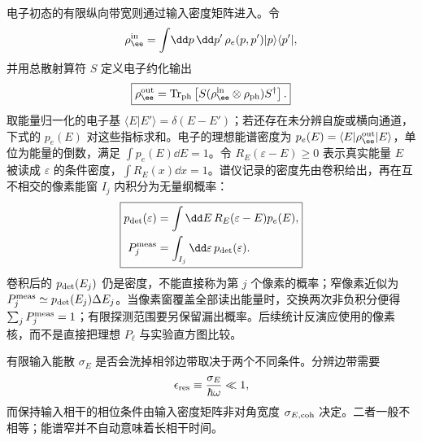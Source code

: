 电子初态的有限纵向带宽则通过输入密度矩阵进入。令
\begin{equation*}
 \rho_\ee^{\rm in}
 =\int\!\dd p\,\dd p'\,
 \rho_e(p,p')|p\rangle\langle p'|,
\end{equation*}
并用总散射算符 $S$ 定义电子约化输出
\begin{equation}
\boxed{
 \rho_\ee^{\rm out}
 =\operatorname{Tr}_{\rm ph}
 \left[S(\rho_\ee^{\rm in}\otimes\rho_{\rm ph})S^\dagger\right].}
\label{eq:finite_envelope_reduced_output_dp47}
\end{equation}
取能量归一化的电子基 $\langle E|E'\rangle=\delta(E-E')$；若还存在未分辨自旋或横向通道，下式的 $p_e(E)$ 对这些指标求和。电子的理想能谱密度为 $p_e(E)=\langle E|\rho_\ee^{\rm out}|E\rangle$，单位为能量的倒数，满足 $\int p_e(E)\dd E=1$。令 $R_E(\varepsilon-E)\ge0$ 表示真实能量 $E$ 被读成 $\varepsilon$ 的条件密度，$\int R_E(x)\dd x=1$。谱仪记录的密度先由卷积给出，再在互不相交的像素能窗 $I_j$ 内积分为无量纲概率：
\begin{equation}
\boxed{
 \begin{aligned}
 p_{\rm det}(\varepsilon)&=\int\dd E\,R_E(\varepsilon-E)p_e(E),\\
 P_j^{\rm meas}&=\int_{I_j}\dd\varepsilon\,p_{\rm det}(\varepsilon).
 \end{aligned}}
\label{eq:pinem_detector_convolution_dp47}
\end{equation}
卷积后的 $p_{\rm det}(E_j)$ 仍是密度，不能直接称为第 $j$ 个像素的概率；窄像素近似为 $P_j^{\rm meas}\simeq p_{\rm det}(E_j)\Delta E_j$。当像素窗覆盖全部读出能量时，交换两次非负积分便得 $\sum_jP_j^{\rm meas}=1$；有限探测范围要另保留漏出概率。后续统计反演应使用的像素核，而不是直接把理想 $P_\ell$ 与实验直方图比较。

有限输入能散 $\sigma_E$ 是否会洗掉相邻边带取决于两个不同条件。分辨边带需要
\begin{equation}
 \epsilon_{\rm res}\equiv\frac{\sigma_E}{\hbar\omega}\ll1,
\end{equation}
而保持输入相干的相位条件由输入密度矩阵非对角宽度 $\sigma_{E,{\rm coh}}$ 决定。二者一般不相等；能谱窄并不自动意味着长相干时间。
